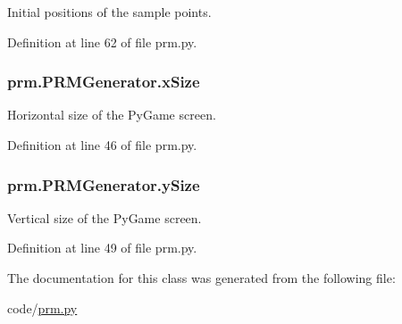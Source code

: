 Initial positions of the sample points. 



Definition at line 62 of file prm.\-py.

\hypertarget{classprm_1_1PRMGenerator_a0cf38de489be01fc5ed01c1a59da8f0b}{
\subsubsection[{x\-Size}]{\setlength{\rightskip}{0pt plus 5cm}prm.\-P\-R\-M\-Generator.\-x\-Size}}\label{classprm_1_1PRMGenerator_a0cf38de489be01fc5ed01c1a59da8f0b}


Horizontal size of the Py\-Game screen. 



Definition at line 46 of file prm.\-py.

\hypertarget{classprm_1_1PRMGenerator_aaa5cf5ecddd099bf8c294cad0b33be92}{
\subsubsection[{y\-Size}]{\setlength{\rightskip}{0pt plus 5cm}prm.\-P\-R\-M\-Generator.\-y\-Size}}\label{classprm_1_1PRMGenerator_aaa5cf5ecddd099bf8c294cad0b33be92}


Vertical size of the Py\-Game screen. 



Definition at line 49 of file prm.\-py.



The documentation for this class was generated from the following file\-:\begin{DoxyCompactItemize}
\item 
code/\hyperlink{prm_8py}{prm.\-py}\end{DoxyCompactItemize}
